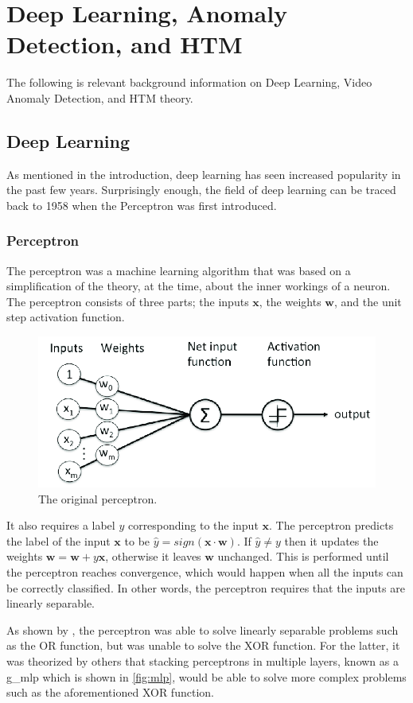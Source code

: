 \chapter{Deep Learning, Anomaly Detection, and HTM}
\label{sec:background}
The following is relevant background information on Deep Learning, Video Anomaly Detection, and HTM theory.
\section{Deep Learning}
As mentioned in the introduction, deep learning has seen increased popularity in the past few years. Surprisingly enough, the field of deep learning can be traced back to 1958 when the Perceptron\cite{perceptron,perceptron2} was first introduced.
\subsection{Perceptron}
The perceptron\cite{perceptron, perceptron2} was a machine learning algorithm that was based on a simplification of the theory, at the time, about the inner workings of a neuron. The perceptron consists of three parts; the inputs $\mathbf{x}$, the weights $\mathbf{w}$, and the unit step activation function.
\begin{figure}[H]
    \centering
    \includegraphics[width=0.6\linewidth]{resources/related_works/perceptron.png}
    \caption{The original perceptron.}
\end{figure}
It also requires a label $y$ corresponding to the input $\mathbf{x}$. The perceptron predicts the label of the input $\mathbf{x}$ to be $\hat{y}=sign(\mathbf{x}\cdot\mathbf{w})$. If $\hat{y}\neq y$ then it updates the weights $\mathbf{w}=\mathbf{w}+y\mathbf{x}$, otherwise it leaves $\mathbf{w}$ unchanged. This is performed until the perceptron reaches convergence, which would happen when all the inputs can be correctly classified. In other words, the perceptron requires that the inputs are linearly separable.
\par
As shown by \textcite{perceptron3}, the perceptron was able to solve linearly separable problems such as the OR function, but was unable to solve the XOR function. For the latter, it was theorized by others that stacking perceptrons in multiple layers, known as a \gls*{g_mlp} which is shown in \autoref{fig:mlp}, would be able to solve more complex problems such as the aforementioned XOR function\cite{perceptron_misconceptions}.
